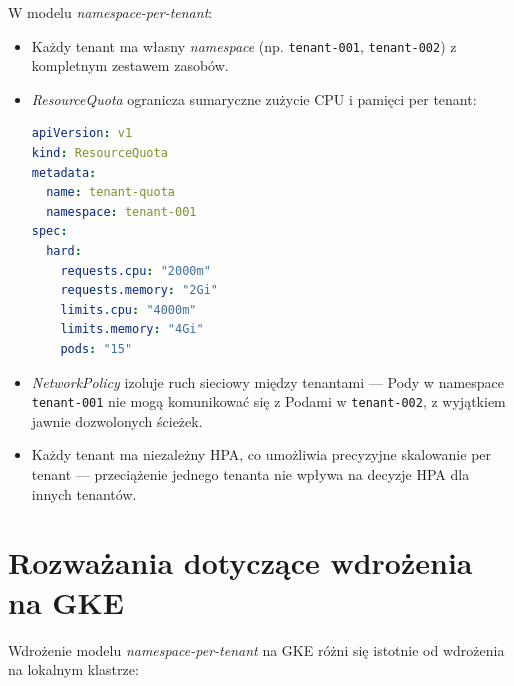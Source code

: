 W modelu \textit{namespace-per-tenant}:

\begin{itemize}
  \item Każdy tenant ma własny \textit{namespace} (np. \texttt{tenant-001}, \texttt{tenant-002}) z kompletnym zestawem zasobów.
  \item \textit{ResourceQuota} ogranicza sumaryczne zużycie CPU i pamięci per tenant:
  \begin{lstlisting}[language=yaml, caption={Przykładowa \textit{ResourceQuota} per tenant}, label={lst:resource-quota}]
apiVersion: v1
kind: ResourceQuota
metadata:
  name: tenant-quota
  namespace: tenant-001
spec:
  hard:
    requests.cpu: "2000m"
    requests.memory: "2Gi"
    limits.cpu: "4000m"
    limits.memory: "4Gi"
    pods: "15"
  \end{lstlisting}
  \item \textit{NetworkPolicy} izoluje ruch sieciowy między tenantami — Pody w namespace \texttt{tenant-001} nie mogą komunikować się z Podami w \texttt{tenant-002}, z wyjątkiem jawnie dozwolonych ścieżek.
  \item Każdy tenant ma niezależny HPA, co umożliwia precyzyjne skalowanie per tenant — przeciążenie jednego tenanta nie wpływa na decyzje HPA dla innych tenantów.
\end{itemize}

\section{Rozważania dotyczące wdrożenia na GKE}

Wdrożenie modelu \textit{namespace-per-tenant} na GKE różni się istotnie od wdrożenia na lokalnym klastrze:

